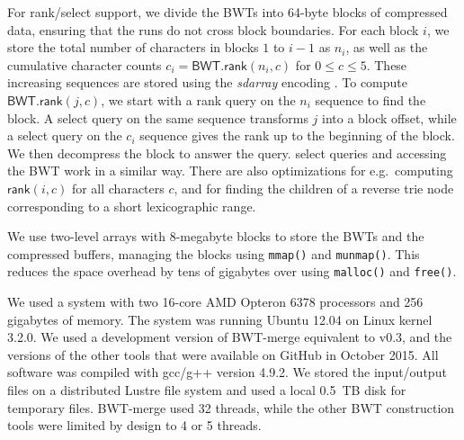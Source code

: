 \documentclass[smallabstract,smallcaptions]{dccpaper}
\newcommand{\BWT}{\textsf{BWT}}
\newcommand{\mBWT}{\ensuremath{\mathsf{BWT}}}
\newcommand{\rank}{\textsf{rank}}
\newcommand{\select}{\textsf{select}}
\newcommand{\mrank}{\ensuremath{\mathsf{rank}}}
\newcommand{\BWTmerge}{\textsf{BWT\nobreakdash-merge}}
\begin{document}
For \rank/\select{} support, we divide the \BWT{}s into 64\nobreakdash-byte blocks of compressed data, ensuring that the runs do not cross block boundaries. For each block $i$, we store the total number of characters in blocks $1$ to $i-1$ as $n_{i}$, as well as the cumulative character counts $c_{i} = \mBWT.\mrank(n_{i},c)$ for $0 \le c \le 5$. These increasing sequences are stored using the \emph{sdarray} encoding \cite{Okanohara2007}. To compute $\mBWT.\mrank(j,c)$, we start with a \rank{} query on the $n_{i}$ sequence to find the block. A \select{} query on the same sequence transforms $j$ into a block offset, while a \select{} query on the $c_{i}$ sequence gives the rank up to the beginning of the block. We then decompress the block to answer the query. \select{} queries and accessing the \BWT{} work in a similar way. There are also optimizations for e.g.~computing $\mrank(i,c)$ for all characters $c$, and for finding the children of a reverse trie node corresponding to a short lexicographic range.

We use two-level arrays with 8\nobreakdash-megabyte blocks to store the \BWT{}s and the compressed buffers, managing the blocks using \texttt{mmap()} and \texttt{munmap()}. This reduces the space overhead by tens of gigabytes over using \texttt{malloc()} and \texttt{free()}.



We used a system with two 16\nobreakdash-core AMD Opteron 6378 processors and 256 gigabytes of memory. The system was running Ubuntu 12.04 on Linux kernel 3.2.0. We used a development version of \BWTmerge{}  equivalent to v0.3, and the versions of the other tools that were available on GitHub in October 2015. All software was compiled with gcc/g++ version 4.9.2. We stored the input/output files on a distributed Lustre file system and used a local 0.5~TB disk for temporary files. \BWTmerge{} used 32 threads, while the other \BWT{} construction tools were limited by design to 4 or 5 threads.
\end{document}
